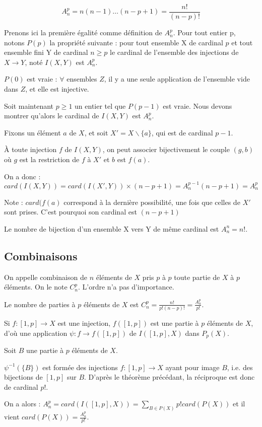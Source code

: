 \documentclass[french]{yLectureNote}
\begin{document}
\begin{theorem}[]
\[A^p_n = n(n-1)\dots(n-p+1) = \frac{n!}{(n-p)!}\]
\end{theorem}
\begin{myproof}
Prenons ici la première égalité comme définition de $A^p_n$.  Pour tout entier p, notons $P(p)$ la propriété suivante :
pour tout ensemble X de cardinal $p$ et tout ensemble fini Y de cardinal $n\geq p$  le cardinal de l'ensemble des injections de $X\to Y$, noté $I(X,Y)$ est $A^p_n$.

$P(0)$ est vraie : $\forall$ ensembles $Z$, il y a une seule application de l'ensemble vide dans $Z$, et elle est injective.

Soit maintenant $p\geq 1$ un entier tel que $P(p-1)$ est vraie. Nous devons montrer qu'alors le cardinal de $I(X,Y)$ est $A^p_n$.

Fixons un élément $a$ de $X$, et soit $X' = X \backslash \{a\}$, qui est de cardinal $p-1$.

À toute injection $f$ de $I(X,Y)$, on peut associer bijectivement le couple $(g,b)$ où $g$ est la restriction de $f$ à $X'$ et $b$ est $f(a)$.

On a donc : $card(I(X,Y)) = card(I(X',Y)) \times (n-p+1) = A^{p-1}_n (n-p+1) = A^p_n$

Note : $card(f(a)$ correspond à la dernière possibilité, une fois que celles de $X'$ sont prises. C'est pourquoi son cardinal est $(n-p+1)$
\end{myproof}
\begin{theorem}[]
Le nombre de bijection d'un ensemble X vers Y de m\^eme cardinal est $A^n_n = n!$.
\end{theorem}
\subsection{Combinaisons}
On appelle combinaison de $n$ éléments de $X$ pris $p$ à $p$ toute partie de $X$ à $p$ éléments. On le note $C^p_n$. L'ordre n'a pas d'importance.
\begin{theorem}[]
Le nombre de parties à $p$ éléments de $X$ est $C^p_n = \frac{n!}{p!(n-p)!} = \frac{A^p_n}{p!}$.
\end{theorem}
\begin{myproof}
Si $f : [1,p] \to X$ est une injection, $f([1,p])$ est une partie à $p$ éléments de $X$, d'où une application $\psi : f\to f([1,p])$ de $I([1,p],X)$ dans $P_p(X)$.

Soit $B$ une partie à $p$ éléments de $X$.

$\psi^{-1}(\{B\})$ est formée des injections $f : [1,p] \to X$ ayant pour image $B$, i.e. des bijections de $[1,p]$ sur $B$. D'après le théorème précédant, la réciproque est donc de cardinal $p!$.

On a alors : $A^p_n = card(I([1,p],X)) = \sum_{B\in P(X)} p! card(P(X))$ et il vient $card(P(X)) = \frac{A^p_n}{p!}$.
\end{myproof}
\end{document}
